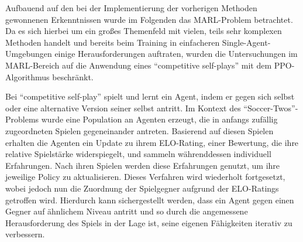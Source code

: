  Aufbauend auf den bei der Implementierung der vorherigen Methoden gewonnenen Erkenntnissen wurde im Folgenden das \ac{MARL}-Problem betrachtet. Da es sich hierbei um ein großes Themenfeld mit vielen, teils sehr komplexen Methoden handelt und bereits beim Training in einfacheren Single-Agent-Umgebungen einige Herausforderungen auftraten, wurden die Untersuchungen im \ac{MARL}-Bereich auf die Anwendung eines ``competitive self-plays'' mit dem \ac{PPO}-Algorithmus beschränkt.
 
 Bei ``competitive self-play'' spielt und lernt ein Agent, indem er gegen sich selbst oder eine alternative Version seiner selbst antritt. Im Kontext des ``Soccer-Twos''-Problems wurde eine Population an Agenten erzeugt, die in anfangs zufällig zugeordneten Spielen gegeneinander antreten. Basierend auf diesen Spielen erhalten die Agenten ein Update zu ihrem ELO-Rating, einer Bewertung, die ihre relative Spielstärke widerspiegelt, und sammeln währenddessen individuell Erfahrungen. Nach ihren Spielen werden diese Erfahrungen genutzt, um ihre jeweilige Policy zu aktualisieren. Dieses Verfahren wird wiederholt fortgesetzt, wobei jedoch nun die Zuordnung der Spielgegner aufgrund der ELO-Ratings getroffen wird. Hierdurch kann sichergestellt werden, dass ein Agent gegen einen Gegner auf ähnlichem Niveau antritt und so durch die angemessene Herausforderung des Spiels in der Lage ist, seine eigenen Fähigkeiten iterativ zu verbessern.